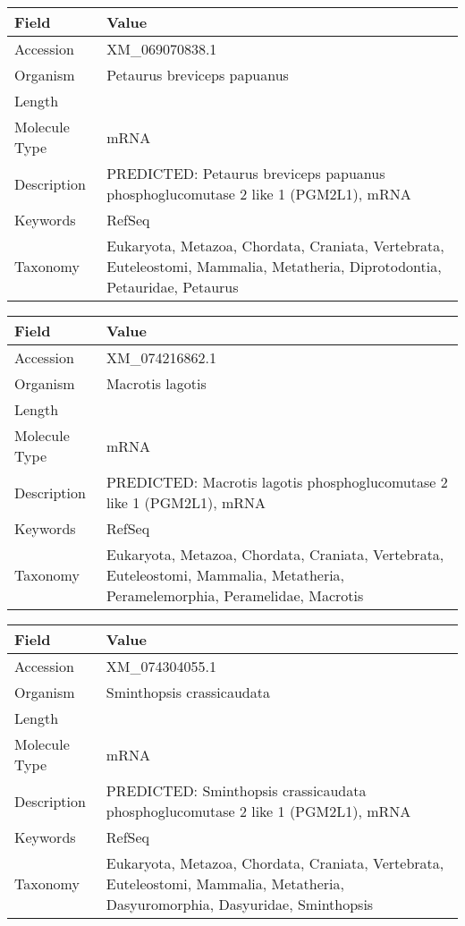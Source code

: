 \documentclass[10pt]{article}
\begin{document}
{\footnotesize
\begin{longtable}{>{\raggedright\arraybackslash}p{4.5cm} >{\raggedright\arraybackslash}p{11.5cm}}
\textbf{Field} & \textbf{Value} \\
\hline
Accession & XM\_069070838.1 \\
Organism & Petaurus breviceps papuanus \\
Length & 10471 \\
Molecule Type & mRNA \\
Description & PREDICTED: Petaurus breviceps papuanus phosphoglucomutase 2 like 1 (PGM2L1), mRNA \\
Keywords & RefSeq \\
Taxonomy & Eukaryota, Metazoa, Chordata, Craniata, Vertebrata, Euteleostomi, Mammalia, Metatheria, Diprotodontia, Petauridae, Petaurus \\
\end{longtable}
}

{\footnotesize
\begin{longtable}{>{\raggedright\arraybackslash}p{4.5cm} >{\raggedright\arraybackslash}p{11.5cm}}
\textbf{Field} & \textbf{Value} \\
\hline
Accession & XM\_074216862.1 \\
Organism & Macrotis lagotis \\
Length & 9080 \\
Molecule Type & mRNA \\
Description & PREDICTED: Macrotis lagotis phosphoglucomutase 2 like 1 (PGM2L1), mRNA \\
Keywords & RefSeq \\
Taxonomy & Eukaryota, Metazoa, Chordata, Craniata, Vertebrata, Euteleostomi, Mammalia, Metatheria, Peramelemorphia, Peramelidae, Macrotis \\
\end{longtable}
}

{\footnotesize
\begin{longtable}{>{\raggedright\arraybackslash}p{4.5cm} >{\raggedright\arraybackslash}p{11.5cm}}
\textbf{Field} & \textbf{Value} \\
\hline
Accession & XM\_074304055.1 \\
Organism & Sminthopsis crassicaudata \\
Length & 2919 \\
Molecule Type & mRNA \\
Description & PREDICTED: Sminthopsis crassicaudata phosphoglucomutase 2 like 1 (PGM2L1), mRNA \\
Keywords & RefSeq \\
Taxonomy & Eukaryota, Metazoa, Chordata, Craniata, Vertebrata, Euteleostomi, Mammalia, Metatheria, Dasyuromorphia, Dasyuridae, Sminthopsis \\
\end{longtable}
}
\end{document}
